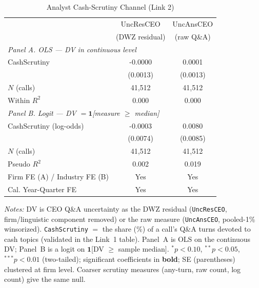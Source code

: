 \begin{table}[htbp]
\centering
\caption{Analyst Cash-Scrutiny Channel (Link 2)}
\label{tab:cash_scrutiny_channel}
\small
\begin{tabular}{lcc}
\toprule
 & UncResCEO & UncAnsCEO \\
 & (DWZ residual) & (raw Q\&A) \\
\midrule
\multicolumn{3}{l}{\textit{Panel A. OLS --- DV in continuous level}} \\
CashScrutiny & -0.0000 & 0.0001 \\
 & (0.0013) & (0.0013) \\
$N$ (calls) & 41,512 & 41,512 \\
Within $R^2$ & 0.000 & 0.000 \\
\midrule
\multicolumn{3}{l}{\textit{Panel B. Logit --- DV $= \mathbf{1}$[measure $\geq$ median]}} \\
CashScrutiny (log-odds) & -0.0003 & 0.0080 \\
 & (0.0074) & (0.0085) \\
$N$ (calls) & 41,512 & 41,512 \\
Pseudo $R^2$ & 0.002 & 0.019 \\
\midrule
Firm FE (A) / Industry FE (B) & Yes & Yes \\
Cal. Year-Quarter FE & Yes & Yes \\
\bottomrule
\end{tabular}
\begin{minipage}{\linewidth}\vspace{2pt}\scriptsize
\textit{Notes:} DV is CEO Q\&A uncertainty as the DWZ residual (\texttt{UncResCEO}, firm/linguistic component removed) or the raw measure (\texttt{UncAnsCEO}, pooled-1\% winsorized). \texttt{CashScrutiny} $=$ the share (\%) of a call's Q\&A turns devoted to cash topics (validated in the Link~1 table). Panel~A is OLS on the continuous DV; Panel~B is a logit on $\mathbf{1}$[DV $\geq$ sample median]. $^{*}p<0.10$, $^{**}p<0.05$, $^{***}p<0.01$ (two-tailed); significant coefficients in \textbf{bold}; SE (parentheses) clustered at firm level. Coarser scrutiny measures (any-turn, raw count, log count) give the same null.
\end{minipage}
\end{table}
